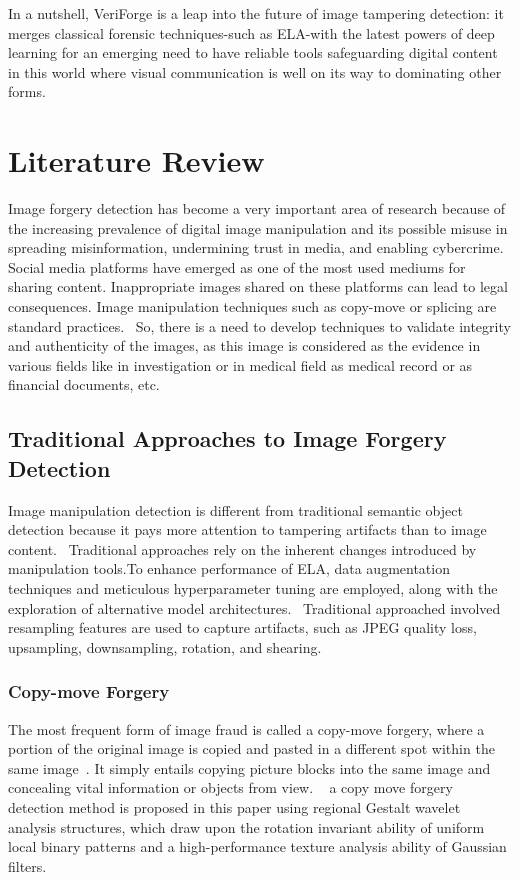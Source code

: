 \documentclass{ieeeaccess}
\begin{document}
In a nutshell, VeriForge is a leap into the future of image tampering detection: it merges classical forensic techniques-such as ELA-with the latest powers of deep learning for an emerging need to have reliable tools safeguarding digital content in this world where visual communication is well on its way to dominating other forms.

\section{Literature Review}

Image forgery detection has become a very important area of research because of the increasing prevalence of digital image manipulation and its possible misuse in spreading misinformation, undermining trust in media, and enabling cybercrime. Social media platforms have emerged as one of the most used mediums for sharing content. Inappropriate images shared on these platforms can lead to legal consequences. Image manipulation techniques such as copy-move or splicing are standard practices.~\cite{10747914} So, there is a need to develop techniques to validate integrity and authenticity of the images, as this image is considered as the evidence in various fields like in investigation or in medical field as medical record or as financial documents, etc.~\cite{9670931}

\subsection{Traditional Approaches to Image Forgery Detection}
Image manipulation detection is different from traditional semantic object detection because it pays more attention to tampering artifacts than to image content.~\cite{zhou2018learning}
Traditional approaches rely on the inherent changes introduced by manipulation tools.To enhance performance of ELA, data augmentation techniques and meticulous hyperparameter tuning are employed, along with the exploration of alternative model architectures.~\cite{boustany2024image}
 Traditional approached involved resampling features are used to capture artifacts, such as JPEG quality loss, upsampling, downsampling, rotation, and shearing.~\cite{8626149} 
 
 \subsubsection{Copy-move Forgery} 
 The most frequent form of image fraud is called a copy-move forgery, where a portion of the original image is copied and pasted in a different spot within the same image~\cite{10151341}. It simply entails copying picture blocks into the same image and concealing vital information or objects from view. ~\cite{chou2018copy} a copy move forgery detection method is proposed in this paper using regional Gestalt wavelet analysis structures, which draw upon the rotation invariant ability of uniform local binary patterns and a high-performance texture analysis ability of Gaussian filters.
 
\end{document}
